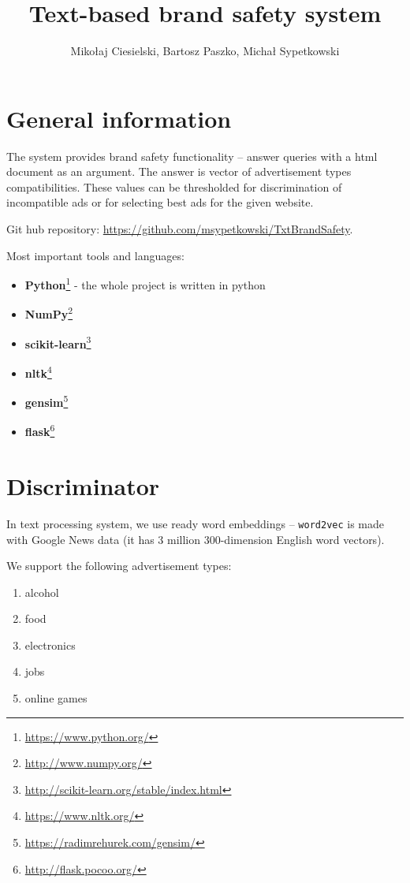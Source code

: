 \documentclass[a4paper]{article}
\begin{document}
\title{Text-based brand safety system}

\author{Mikołaj Ciesielski, Bartosz Paszko, Michał Sypetkowski}
\maketitle

\section{General information}

The system provides brand safety functionality --
answer queries with a html document as an argument.
The answer is vector of advertisement types compatibilities.
These values can be thresholded for discrimination of incompatible
ads or for selecting best ads for the given website.


Git hub repository: \url{https://github.com/msypetkowski/TxtBrandSafety}.

Most important tools and languages:
\begin{itemize}
    \item \textbf{Python}\footnote{\url{https://www.python.org/}}
        - the whole project is written in python
    \item \textbf{NumPy}\footnote{\url{http://www.numpy.org/}}
    \item \textbf{scikit-learn}\footnote{\url{http://scikit-learn.org/stable/index.html}}
    \item \textbf{nltk}\footnote{\url{https://www.nltk.org/}}
    \item \textbf{gensim}\footnote{\url{https://radimrehurek.com/gensim/}}
    \item \textbf{flask}\footnote{\url{http://flask.pocoo.org/}}
\end{itemize}


\section{Discriminator}
In text processing system, we use ready word embeddings --
\texttt{word2vec} is made with Google News data (it has 3 million 300-dimension English word vectors).


We support the following advertisement types:
\begin{enumerate}
    \item alcohol
    \item food
    \item electronics
    \item jobs
    \item online games
\end{enumerate}
\end{document}

